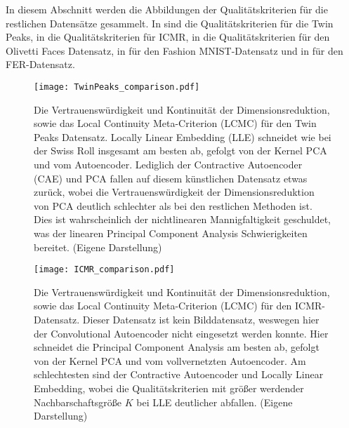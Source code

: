 In diesem Abschnitt werden die Abbildungen der Qualitätskriterien für die restlichen Datensätze
gesammelt. In  sind die Qualitätskriterien für die Twin Peaks, in
 die Qualitätskriterien für ICMR, in  die
Qualitätskriterien für den Olivetti Faces Datensatz, in  für den
Fashion MNIST-Datensatz und in  für den FER-Datensatz.
\begin{figure}[ht]
	\begin{center}
		\texttt{[image: TwinPeaks\_comparison.pdf]}
	\end{center}
	\caption[Qualitätskriterien für die Twin Peaks]{Die Vertrauenswürdigkeit und Kontinuität der Dimensionsreduktion, sowie das Local Continuity Meta-Criterion (LCMC) für den Twin Peaks Datensatz. Locally Linear Embedding (LLE) schneidet wie bei der Swiss Roll insgesamt am besten ab, gefolgt von der Kernel PCA und vom Autoencoder. Lediglich der Contractive Autoencoder (CAE) und PCA fallen auf diesem künstlichen Datensatz etwas zurück, wobei die Vertrauenswürdigkeit der Dimensionsreduktion von PCA deutlich schlechter als bei den restlichen Methoden ist. Dies ist wahrscheinlich der nichtlinearen Mannigfaltigkeit geschuldet, was der linearen Principal Component Analysis Schwierigkeiten bereitet. (Eigene Darstellung)}
	\label{fig:TwinPeaksMetrics}
\end{figure}

\begin{figure}[ht]
	\begin{center}
		\texttt{[image: ICMR\_comparison.pdf]}
	\end{center}
	\caption[Qualitätskriterien für den ICMR-Datensatz]{Die Vertrauenswürdigkeit und Kontinuität der Dimensionsreduktion, sowie das Local Continuity Meta-Criterion (LCMC) für den ICMR-Datensatz. Dieser Datensatz ist kein Bilddatensatz, weswegen hier der Convolutional Autoencoder nicht eingesetzt werden konnte. Hier schneidet die Principal Component Analysis am besten ab, gefolgt von der Kernel PCA und vom vollvernetzten Autoencoder. Am schlechtesten sind der Contractive Autoencoder und Locally Linear Embedding, wobei die Qualitätskriterien mit größer werdender Nachbarschaftsgröße $K$ bei LLE deutlicher abfallen. (Eigene Darstellung)}
	\label{fig:ICMRMetrics}
\end{figure}

